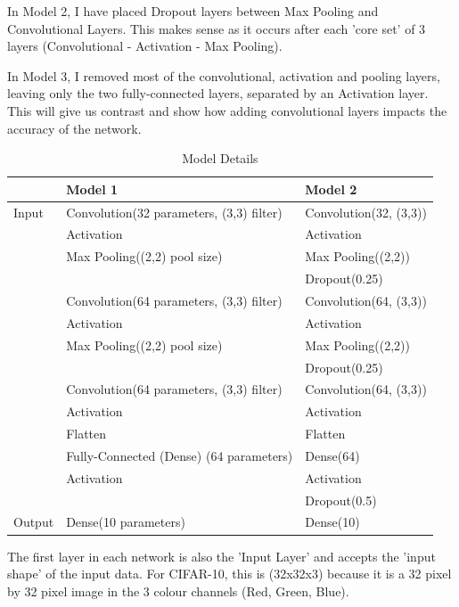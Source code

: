 \documentclass[a4paper, 11pt]{article}
\begin{document}
In Model 2, I have placed Dropout layers between Max Pooling and Convolutional Layers. This makes sense as it occurs after each 'core set' of 3 layers (Convolutional - Activation - Max Pooling).

\ifx In Model 3, I removed most of the convolutional, activation and pooling layers, leaving only the two fully-connected layers, separated by an Activation layer. This will give us contrast and show how adding convolutional layers impacts the accuracy of the network.\fi

\begin{table}[h]
\centering
\caption{Model Details}
\label{tab:model details}
\begin{tabular}{|l|l|l|}
\hline
      & Model 1 & Model 2  \\
\hline
Input & Convolution(32 parameters, (3,3) filter) & Convolution(32, (3,3))   \\
      & Activation & Activation   \\
      & Max Pooling((2,2) pool size) & Max Pooling((2,2))    \\
      &  & Dropout(0.25)   \\
      & Convolution(64 parameters, (3,3) filter) & Convolution(64, (3,3))   \\
      & Activation & Activation   \\
      & Max Pooling((2,2) pool size) & Max Pooling((2,2))    \\
      &  & Dropout(0.25)   \\
      & Convolution(64 parameters, (3,3) filter) & Convolution(64, (3,3))   \\
      & Activation & Activation   \\
      & Flatten & Flatten \\
      & Fully-Connected (Dense) (64 parameters)& Dense(64)  \\
      & Activation & Activation  \\
      &  & Dropout(0.5)   \\
Output & Dense(10 parameters) & Dense(10)  \\
\hline
\end{tabular}
\end{table}

\vspace{5mm} %

The first layer in each network is also the 'Input Layer' and accepts the 'input shape' of the input data. For CIFAR-10, this is (32x32x3) because it is a 32 pixel by 32 pixel image in the 3 colour channels (Red, Green, Blue).
\end{document}
